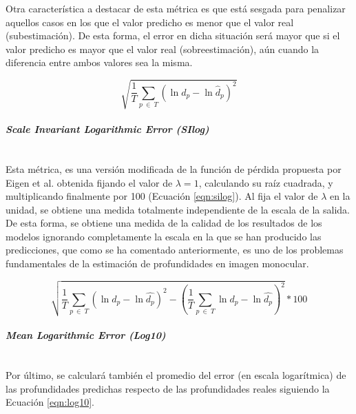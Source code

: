 Otra característica a destacar de esta métrica es que está sesgada para penalizar aquellos casos en los que el valor predicho es menor que el valor real (subestimación). De esta forma, el error en dicha situación será mayor que si el valor predicho es mayor que el valor real (sobreestimación), aún cuando la diferencia entre ambos valores sea la misma.

\begin{equation}
\label{eqn:rmselog}
\sqrt{\frac{1}{T}\sum_{p\ \in\ T} (\ln{d_p} - \ln{\hat{d}_p})^2}
\end{equation}

\paragraph{\textit{Scale Invariant Logarithmic Error (SIlog)}}\mbox{}\\
Esta métrica, es una versión modificada de la función de pérdida propuesta por Eigen et al. obtenida fijando el valor de $\lambda = 1$, calculando su raíz cuadrada, y multiplicando finalmente por 100 (Ecuación \ref{eqn:silog}). Al fija el valor de $\lambda$ en la unidad, se obtiene una medida totalmente independiente de la escala de la salida. De esta forma, se obtiene una medida de la calidad de los resultados de los modelos ignorando completamente la escala en la que se han producido las predicciones, que como se ha comentado anteriormente, es uno de los problemas fundamentales de la estimación de profundidades en imagen monocular.

\begin{equation}
\label{eqn:silog}
\sqrt{
	\frac{1}{T} \sum_{p\ \in\ T} (\ln{d_p} - \ln{\hat{d_p}})^2
	-
	{\left(\frac{1}{T} \sum_{p\ \in\ T} \ln{d_p} - \ln{\hat{d_p}}\right)}^2
} * 100
\end{equation}

\paragraph{\textit{Mean Logarithmic Error (Log10)}}\mbox{}\\
Por último, se calculará también el promedio del error (en escala logarítmica) de las profundidades predichas respecto de las profundidades reales siguiendo la Ecuación \ref{eqn:log10}.

